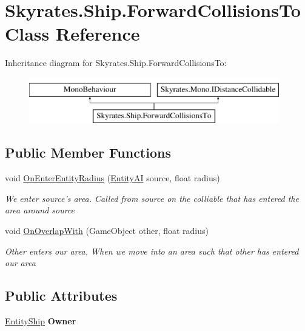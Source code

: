 \hypertarget{class_skyrates_1_1_ship_1_1_forward_collisions_to}{\section{Skyrates.\-Ship.\-Forward\-Collisions\-To Class Reference}
\label{class_skyrates_1_1_ship_1_1_forward_collisions_to}
}
Inheritance diagram for Skyrates.\-Ship.\-Forward\-Collisions\-To\-:\begin{figure}[H]
\begin{center}
\leavevmode
\includegraphics[height=2.000000cm]{class_skyrates_1_1_ship_1_1_forward_collisions_to}
\end{center}
\end{figure}
\subsection*{Public Member Functions}
\begin{DoxyCompactItemize}
\item 
void \hyperlink{class_skyrates_1_1_ship_1_1_forward_collisions_to_a7a20129462eebd5db6260c9bf498e916}{On\-Enter\-Entity\-Radius} (\hyperlink{class_skyrates_1_1_entity_1_1_entity_a_i}{Entity\-A\-I} source, float radius)
\begin{DoxyCompactList}\small\item\em We enter source's area. Called from source on the colliable that has entered the area around source \end{DoxyCompactList}\item 
void \hyperlink{class_skyrates_1_1_ship_1_1_forward_collisions_to_a92d151e3bbd6d216f70bbf0fc6d5a27b}{On\-Overlap\-With} (Game\-Object other, float radius)
\begin{DoxyCompactList}\small\item\em Other enters our area. When we move into an area such that other has entered our area \end{DoxyCompactList}\end{DoxyCompactItemize}
\subsection*{Public Attributes}
\begin{DoxyCompactItemize}
\item 
\hypertarget{class_skyrates_1_1_ship_1_1_forward_collisions_to_a2161ba555d7b50969f33b00252feeef6}{\hyperlink{class_skyrates_1_1_entity_1_1_entity_ship}{Entity\-Ship} {\bfseries Owner}}\label{class_skyrates_1_1_ship_1_1_forward_collisions_to_a2161ba555d7b50969f33b00252feeef6}

\end{DoxyCompactItemize}


